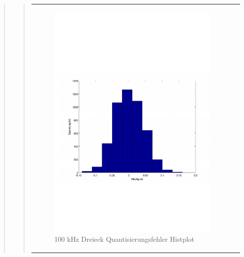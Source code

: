 \begin{quote}
\begin{quote}
        \begin{center}
            \begin{tabular}{ll}
            
            \hspace{-4cm}
                \begin{minipage}{0.6\textwidth}
                    \begin{figure}[H]
                        \includegraphics[scale=0.5, trim = 16mm 70mm 16mm 85mm, clip]
                                        {Bilder/100kHz_dreieck_Quant_Hist}
                        \caption{100 kHz Dreieck Quantisierungsfehler Histplot}
                        \label{fig:100kHz_drei_Hist}
                    \end{figure}
                \end{minipage}
                

\end{tabular}
\end{center}
\end{quote}
\end{quote}
